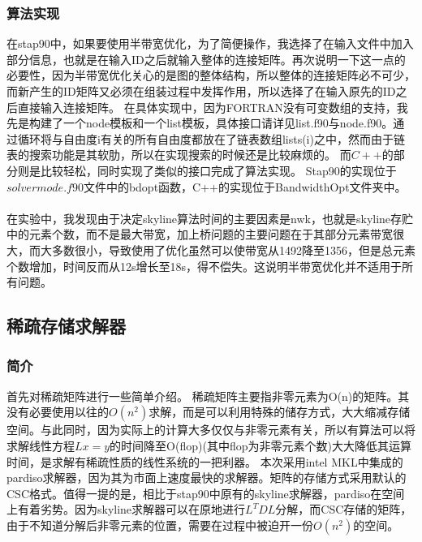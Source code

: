 \documentclass[UTF8]{ctexbook}
\begin{document}
\subsubsection{算法实现}
在stap90中，如果要使用半带宽优化，为了简便操作，我选择了在输入文件中加入部分信息，也就是在输入ID之后就输入整体的连接矩阵。再次说明一下这一点的必要性，因为半带宽优化关心的是图的整体结构，所以整体的连接矩阵必不可少，而新产生的ID矩阵又必须在组装过程中发挥作用，所以选择了在输入原先的ID之后直接输入连接矩阵。
在具体实现中，因为FORTRAN没有可变数组的支持，我先是构建了一个node模板和一个list模板，具体接口请详见list.f90与node.f90。通过循环将与自由度i有关的所有自由度都放在了链表数组lists(i)之中，然而由于链表的搜索功能是其软肋，所以在实现搜索的时候还是比较麻烦的。
而$C++$的部分则是比较轻松，同时实现了类似的接口完成了算法实现。
Stap90的实现位于$solvermode.f90$文件中的bdopt函数，C++的实现位于BandwidthOpt文件夹中。
\paragraph{}
在实验中，我发现由于决定skyline算法时间的主要因素是nwk，也就是skyline存贮中的元素个数，而不是最大带宽，加上桥问题的主要问题在于其部分元素带宽很大，而大多数很小，导致使用了优化虽然可以使带宽从1492降至1356，但是总元素个数增加，时间反而从12s增长至18s，得不偿失。这说明半带宽优化并不适用于所有问题。

\subsection{稀疏存储求解器}
\subsubsection{简介}
首先对稀疏矩阵进行一些简单介绍。
稀疏矩阵主要指非零元素为O(n)的矩阵。其没有必要使用以往的$O(n^2)$求解，而是可以利用特殊的储存方式，大大缩减存储空间。与此同时，因为实际上的计算大多仅仅与非零元素有关，所以有算法可以将求解线性方程$Lx=y$的时间降至O(flop)(其中flop为非零元素个数)大大降低其运算时间，是求解有稀疏性质的线性系统的一把利器。
本次采用intel MKL中集成的pardiso求解器，因为其为市面上速度最快的求解器。矩阵的存储方式采用默认的CSC格式。值得一提的是，相比于stap90中原有的skyline求解器，pardiso在空间上有着劣势。因为skyline求解器可以在原地进行$L^TDL$分解，而CSC存储的矩阵，由于不知道分解后非零元素的位置，需要在过程中被迫开一份$O(n^2)$的空间。
\end{document}
